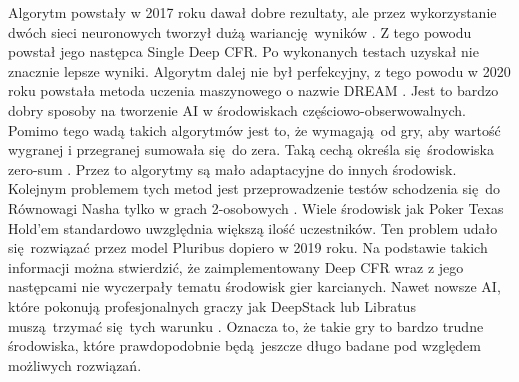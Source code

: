 \documentclass[12pt,oneside,a4paper]{report}
\begin{document}
Algorytm powstały w 2017 roku dawał dobre rezultaty, ale przez wykorzystanie dwóch sieci neuronowych
tworzył dużą wariancję wyników \cite{SD-CFR}. Z tego powodu powstał jego następca Single Deep CFR.
Po wykonanych testach uzyskał nie znacznie lepsze wyniki. Algorytm dalej nie był perfekcyjny, z tego
powodu w 2020 roku powstała metoda uczenia maszynowego o nazwie DREAM \cite{DREAM}. 
Jest to bardzo
dobry sposoby na tworzenie AI w środowiskach częściowo-obserwowalnych.
Pomimo tego wadą takich algorytmów 
jest to, że wymagają od gry,
aby wartość wygranej i przegranej sumowała się do zera. 
Taką cechą określa się środowiska zero-sum
\cite{DCFR}. Przez to algorytmy są mało adaptacyjne do innych środowisk.  
Kolejnym problemem tych
metod jest przeprowadzenie testów schodzenia się do Równowagi Nasha tylko w grach 2-osobowych \cite{DCFR}.
Wiele środowisk jak Poker Texas Hold'em standardowo uwzględnia większą ilość uczestników. Ten
problem udało się rozwiązać przez model Pluribus dopiero w 2019 roku. Na
podstawie takich informacji można stwierdzić, że zaimplementowany Deep CFR wraz z jego następcami nie
wyczerpały tematu środowisk gier karcianych. Nawet nowsze AI, które pokonują profesjonalnych
graczy jak DeepStack lub Libratus muszą trzymać się tych warunku \cite{libratus} \cite{ds}. 
Oznacza to, że takie gry to bardzo trudne środowiska, które prawdopodobnie będą jeszcze
długo badane pod względem możliwych rozwiązań.
\end{document}
